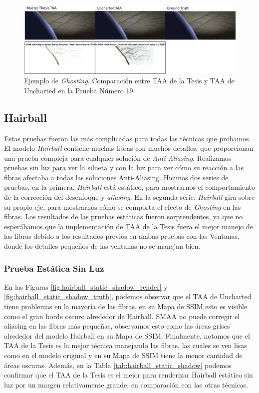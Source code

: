 \documentclass[pregrado]{tesis-usb} %
\begin{document}
\begin{figure}[!htb]
	\centering
	\includegraphics[scale=0.8]{images/results/sphere_ghosting.png}
	\caption{Ejemplo de \textit{Ghosting}. Comparación  entre TAA de la Tesis y TAA de Uncharted en la Prueba Número 19.}\label{fig:sphere_ghosting}
\end{figure}

\FloatBarrier

\subsection{Hairball}
Estas pruebas fueron las más complicadas para todas las técnicas que probamos. El modelo \textit{Hairball} contiene muchas fibras con muchos detalles, que proporcionan una prueba compleja para cualquier solución de \textit{Anti-Aliasing}. Realizamos pruebas sin luz para ver la silueta y con la luz para ver cómo su reacción a las fibras afectaba a todas las soluciones Anti-Aliasing. Hicimos dos series de pruebas, en la primera, \textit{Hairball} está estático, para mostrarnos el comportamiento de la corrección del desenfoque y \textit{aliasing}. En la segunda serie, \textit{Hairball} gira sobre su propio eje, para mostrarnos cómo se comporta el efecto de \textit{Ghosting} en las fibras. Los resultados de las pruebas estáticas fueron sorprendentes, ya que no esperábamos que la implementación de TAA de la Tesis fuera el mejor manejo de las fibras debido a los resultados previos en ambas pruebas con las Ventanas, donde los detalles pequeños de las ventanas no se manejan bien.
\subsubsection{Prueba Estática Sin Luz}
En las Figuras \ref{fig:hairball_static_shadow_render} y \ref{fig:hairball_static_shadow_truth}, podemos observar que el TAA de Uncharted tiene problemas en la mayoría de las fibras, en su Mapa de SSIM esto es visible como el gran borde oscuro alrededor de Hairball. SMAA no puede corregir el aliasing en las fibras más pequeñas, observamos esto como las áreas grises alrededor del modelo Hairball en su Mapa de SSIM. Finalmente, notamos que el TAA de la Tesis es la mejor técnica manejando las fibras, las cuales se ven lisas como en el modelo original y en su Mapa de SSIM tiene la menor cantidad de áreas oscuras. Además, en la Tabla \ref{tab:hairball_static_shadow} podemos confirmar que el TAA de la Tesis es el mejor para renderizar Hairball estático sin luz por un margen relativamente grande, en comparación con las otras técnicas.
\end{document}
